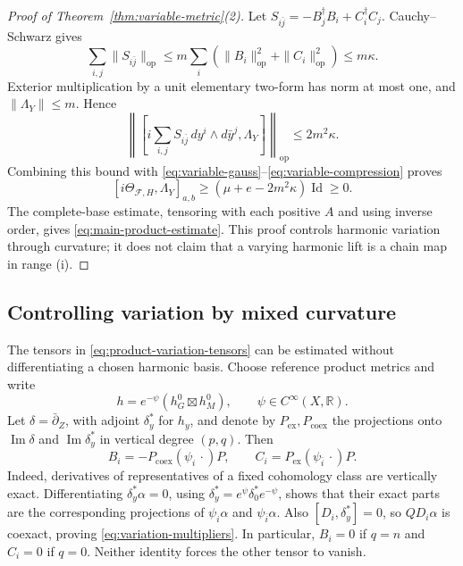 \documentclass[11pt,reqno]{amsart}
\numberwithin{equation}{section}
\theoremstyle{definition}
\theoremstyle{remark}
\newcommand{\db}{\bar\partial}
\newcommand{\cF}{\mathcal F}
\newcommand{\Id}{\operatorname{Id}}
\newcommand{\im}{\operatorname{Im}}
\begin{document}
\begin{proof}[Proof of Theorem~\ref{thm:variable-metric}(2)]
Let $S_{i\bar j}=-B_j^\dagger B_i+C_i^\dagger C_j$. Cauchy--Schwarz gives
\[
 \sum_{i,j}\|S_{i\bar j}\|_{\mathrm{op}}
   \leq m\sum_i(\|B_i\|_{\mathrm{op}}^2+\|C_i\|_{\mathrm{op}}^2)
   \leq m\kappa.
\]
Exterior multiplication by a unit elementary two-form has norm at most one, and $\|\Lambda_Y\|\leq m$. Hence
\[
 \left\|\left[i\sum_{i,j}S_{i\bar j}\,dy^i\wedge d\bar y^j,
                         \Lambda_Y\right]\right\|_{\mathrm{op}}
       \leq2m^2\kappa.
\]
Combining this bound with \eqref{eq:variable-gauss}--\eqref{eq:variable-compression} proves
\begin{equation}\label{eq:variable-curvature-lower}
 [i\Theta_{\cF,H},\Lambda_Y]_{a,b}
       \geq(\mu+e-2m^2\kappa)\Id\geq0.
\end{equation}
The complete-base estimate, tensoring with each positive $A$ and using inverse order, gives \eqref{eq:main-product-estimate}. This proof controls harmonic variation through curvature; it does not claim that a varying harmonic lift is a chain map in range (i).
\end{proof}

\subsection{Controlling variation by mixed curvature}
The tensors in \eqref{eq:product-variation-tensors} can be estimated without differentiating a chosen harmonic basis. Choose reference product metrics and write
\[
 h=e^{-\psi}(h_G^0\boxtimes h_M^0),\qquad \psi\in C^\infty(X,\mathbb R).
\]
Let $\delta=\db_Z$, with adjoint $\delta_y^*$ for $h_y$, and denote by $P_{\mathrm{ex}},P_{\mathrm{coex}}$ the projections onto $\im\delta$ and $\im\delta_y^*$ in vertical degree $(p,q)$. Then
\begin{equation}\label{eq:variation-multipliers}
 B_i=-P_{\mathrm{coex}}(\psi_i\,\cdot)P,
 \qquad C_i=P_{\mathrm{ex}}(\psi_{\bar i}\,\cdot)P.
\end{equation}
Indeed, derivatives of representatives of a fixed cohomology class are vertically exact. Differentiating $\delta_y^*\alpha=0$, using
$\delta_y^*=e^\psi\delta_0^*e^{-\psi}$, shows that their exact parts are the corresponding projections of $\psi_i\alpha$ and $\psi_{\bar i}\alpha$. Also $[D_i,\delta_y^*]=0$, so $QD_i\alpha$ is coexact, proving \eqref{eq:variation-multipliers}. In particular, $B_i=0$ if $q=n$ and $C_i=0$ if $q=0$. Neither identity forces the other tensor to vanish.
\end{document}
